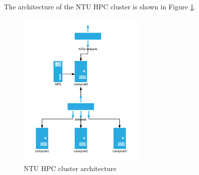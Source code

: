 \noindent The architecture of the NTU HPC cluster is shown in Figure \ref{fig:arch}.

\begin{figure}[ht]
    \centering
    \includegraphics[width=0.55\textwidth]{images/arch.png}
    \caption{NTU HPC cluster architecture}
    \label{fig:arch}
\end{figure}